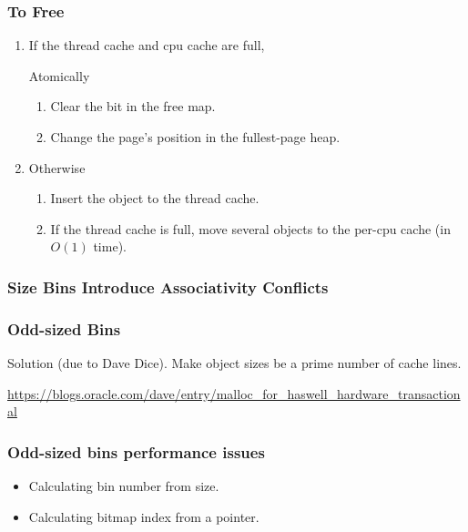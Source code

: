 \documentclass[xcolor=dvipsnames,14pt]{beamer}
\begin{document}
\begin{frame}
\frametitle{To Free}
\begin{enumerate}
\item If the thread cache and cpu cache are full, 

 Atomically
 \begin{enumerate}
 \item Clear the bit in the free map.
 \item Change the page's position in the fullest-page heap.
 \end{enumerate}
\item Otherwise 
 \begin{enumerate}
 \item Insert the object to the thread cache.
 \item If the thread cache is full, move several objects to the per-cpu cache (in $O(1)$ time).
 \end{enumerate}
\end{enumerate}
\end{frame}

\begin{frame}
\frametitle{Size Bins Introduce Associativity Conflicts}

\end{frame}

\begin{frame}
\frametitle{Odd-sized Bins}

Solution (due to Dave Dice).  Make object sizes be a prime number of cache lines.

\url{https://blogs.oracle.com/dave/entry/malloc_for_haswell_hardware_transactional}


\end{frame}

\begin{frame}
\frametitle{Odd-sized bins performance issues}

\begin{itemize}
\item Calculating bin number from size.
\item Calculating bitmap index from a pointer.
\end{itemize}
\end{frame}
\end{document}
